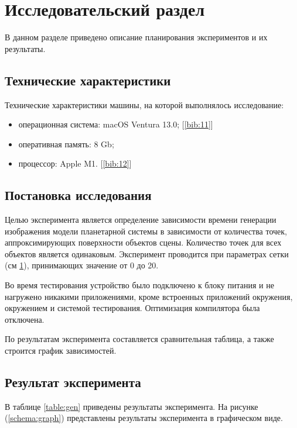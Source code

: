 \chapter{Исследовательский раздел}
\label{cha:research}
    \par В данном разделе приведено описание планирования экспериментов и их результаты.
    \section{Технические характеристики}

    \par Технические характеристики машины, на которой выполнялось исследование:
    \begin{itemize}
        \item операционная система: macOS Ventura 13.0; [\ref{bib:11}]
        \item оперативная память: 8 Gb;
        \item процессор: Apple M1. [\ref{bib:12}]
    \end{itemize}

    \section{Постановка исследования}
    \par Целью эксперимента является определение зависимости времени генерации изображения модели планетарной системы в зависимости от количества точек, аппроксимирующих поверхности объектов сцены. Количество точек для всех объектов является одинаковым. Эксперимент проводится при параметрах сетки (см \ref{cha:research}), принимающих значение от 0 до 20.
    \par Во время тестирования устройство было подключено к блоку питания и не нагружено никакими приложениями, кроме встроенных приложений окружения, окружением и системой тестирования. Оптимизация компилятора была отключена.
    \par По результатам эксперимента составляется сравнительная таблица, а также строится график зависимостей.

    \section{Результат эксперимента}
    \par В таблице \ref{table:gen} приведены результаты эксперимента. На рисунке (\ref{schema:graph}) представлены результаты эксперимента в графическом виде. 

